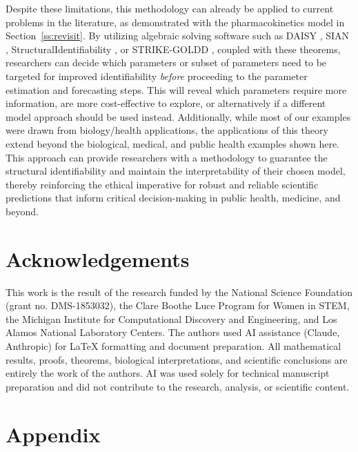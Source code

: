 \documentclass[a4paper,fleqn]{cas-dc}
\theoremstyle{definition}
\begin{document}
Despite these limitations, this methodology can already be applied to current problems in the literature, as demonstrated with the pharmacokinetics model in Section~\ref{ss:revisit}.
By utilizing algebraic solving software such as DAISY \cite{bellu2007daisy}, SIAN \cite{hong2019sian}, StructuralIdentifiability \cite{dong2023differential}, or STRIKE-GOLDD \cite{diaz2023strike}, coupled with these theorems, researchers can decide which parameters or subset of parameters need to be targeted for improved identifiability \textit{before} proceeding to the parameter estimation and forecasting steps.
This will reveal which parameters require more information, are more cost-effective to explore, or alternatively if a different model approach should be used instead.
Additionally, while most of our examples were drawn from biology/health applications, the applications of this theory extend beyond the biological, medical, and public health examples shown here.
This approach can provide researchers with a methodology to guarantee the structural identifiability and maintain the interpretability of their chosen model, thereby reinforcing the ethical imperative for robust and reliable scientific predictions that inform critical decision-making in public health, medicine, and beyond.

\section{Acknowledgements}
\noindent This work is the result of the research funded by the National Science Foundation  (grant no. DMS-1853032), the Clare Boothe Luce Program for Women in STEM, the Michigan Institute for Computational Discovery and Engineering, and Los Alamos National Laboratory Centers. The authors used AI assistance (Claude, Anthropic) for LaTeX formatting and document preparation. All mathematical results, proofs, theorems, biological interpretations, and scientific conclusions are entirely the work of the authors. AI was used solely for technical manuscript preparation and did not contribute to the research, analysis, or scientific content.

\printcredits

%




\appendix
\section{Appendix}
\end{document}

